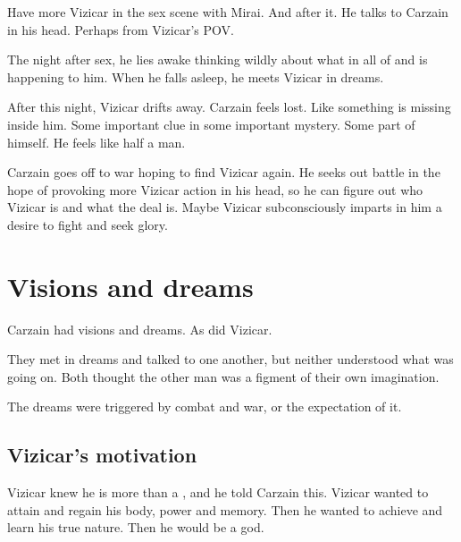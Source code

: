 Have more Vizicar in the sex scene with Mirai. 
And after it. 
He talks to Carzain in his head. 
Perhaps from Vizicar's POV. 

The night after sex, he lies awake thinking wildly about what in all of \Iquin and \Itzach is happening to him. 
When he falls asleep, he meets Vizicar in dreams. 

After this night, Vizicar drifts away. 
Carzain feels lost. 
Like something is missing inside him. 
Some important clue in some important mystery. 
Some part of himself. 
He feels like half a man. 

Carzain goes off to war hoping to find Vizicar again.  
He seeks out battle in the hope of provoking more Vizicar action in his head, so he can figure out who Vizicar is and what the deal is. 
Maybe Vizicar subconsciously imparts in him a desire to fight and seek glory. 
















\section{Visions and dreams}
Carzain had visions and dreams. 
As did Vizicar. 

They met in dreams and talked to one another, but neither understood what was going on. 
Both thought the other man was a figment of their own imagination. 

The dreams were triggered by combat and war, or the expectation of it. 









\subsection{Vizicar's motivation}
Vizicar knew he is more than a \human, and he told Carzain this. 
Vizicar wanted to attain \kenosis and regain his body, power and memory. 
Then he wanted to achieve \apotheosis and learn his true nature.
Then he would be a god.












